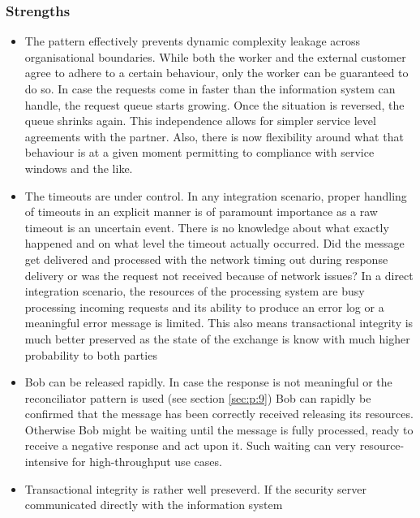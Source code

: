 \documentclass[10pt,a4paper]{article}
\begin{document}
\subsubsection{Strengths}
	\begin{itemize}
		\item The pattern effectively prevents dynamic complexity leakage across organisational boundaries. While both the worker and the external customer agree to adhere to a certain behaviour, only the worker can be guaranteed to do so. In case the requests come in faster than the information system can handle, the request queue starts growing. Once the situation is reversed, the queue shrinks again. This independence allows for simpler service level agreements with the partner. Also, there is now flexibility around what that behaviour is at a given moment permitting to compliance with service windows and the like. 
		\item The timeouts are under control. In any integration scenario, proper handling of timeouts in an explicit manner is of paramount importance as a raw timeout is an uncertain event. There is no knowledge about what exactly happened and on what level the timeout actually occurred. Did the message get delivered and processed with the network timing out during response delivery or was the request not received because of network issues? In a direct integration scenario, the resources of the processing system are busy processing incoming requests and its ability to produce an error log or a meaningful error message is limited. This also means transactional integrity is much better preserved as the state of the exchange is know with much higher probability to both parties 
		\item Bob can be released rapidly. In case the response is not meaningful or the reconciliator pattern is used (see section \ref{sec:p:9}) Bob can rapidly be confirmed that the message has been correctly received releasing its resources. Otherwise Bob might be waiting until the message is fully processed, ready to receive a negative response and act upon it. Such waiting can very resource-intensive for high-throughput use cases. 
		\item Transactional integrity is rather well preseverd. If the security server communicated directly with the information system
	\end{itemize}
\end{document}
